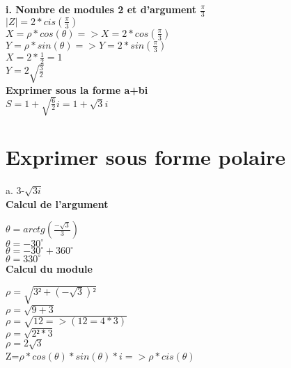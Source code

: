 \textbf{i. Nombre de modules 2 et d'argument $\frac{\pi}{3}$} \\

$|Z| = 2*cis(\frac{\pi}{3})$ \\

$X= \rho * cos(\theta) => X = 2*cos(\frac{\pi}{3})$  \\
$Y = \rho * sin(\theta) => Y = 2*sin(\frac{\pi}{3})$ \\

$X = 2*\frac{1}{2} = 1$ \\
$Y = 2\sqrt{\frac{3}{2}}$ \\

\textbf{Exprimer sous la forme a+bi} \\

$S = 1 + \sqrt{\frac{6}{2}} i = 1 + \sqrt{3} i$ \\

\newpage
\vspace{3mm} %
\section{Exprimer sous forme polaire}
\vspace{3mm} %

a. 3-$\sqrt{3i}$ \\

\textbf{Calcul de l'argument} \\
\vspace{3mm} %

$\theta = arctg(\frac{-\sqrt{3}} {3})$ \\
$\theta = -30^{\circ}$ \\
$\theta = -30^{\circ} + 360^{\circ}$ \\
$\theta = 330^{\circ}$ \\

\textbf{Calcul du module} \\
\vspace{3mm} %

$\rho = \sqrt{3²+(-\sqrt{3})²}$ \\
$\rho = \sqrt{9+3}$ \\
$\rho = \sqrt{12 => (12=4*3)}$ \\
$\rho = \sqrt{2²*3}$ \\
$\rho = 2\sqrt{3}$ \\

Z=$\rho * cos(\theta)*sin(\theta)*i => \rho * cis(\theta)$ \\

